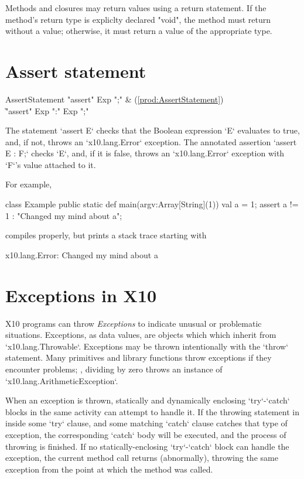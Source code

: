Methods and closures may return values using a return statement.
If the method's return type is expliclty declared \xcd"void",
the method must return without a value; otherwise, it must return
a value of the appropriate type.


\section{Assert statement} 

\begin{bbgrammar}
 AssertStatement    \: \xcd"assert" Exp \xcd";" & (\ref{prod:AssertStatement})\\%
    \| \xcd"assert" Exp  \xcd":" Exp  \xcd";"\\

\end{bbgrammar}

The statement \xcd`assert E` checks that the Boolean expression \xcd`E`
evaluates to true, and, if not, throws an \xcd`x10.lang.Error`  exception.  
The annotated assertion \xcd`assert E : F;` checks \xcd`E`, and, if it is
false, throws an \xcd`x10.lang.Error` exception with \xcd`F`'s value attached
to it. 

For example, 
% 
\begin{xten}
class Example {
  public static def main(argv:Array[String](1)) {
    val a = 1;
    assert a != 1 : "Changed my mind about a";
  }
}
\end{xten}
\noindent
compiles properly, but prints a stack trace starting with 
\begin{xten}
x10.lang.Error: Changed my mind about a
\end{xten}


\section{Exceptions in X10}

X10 programs can throw {\em Exceptions} to indicate unusual or problematic
situations.  Exceptions, as data values, are objects which which inherit from
\xcd`x10.lang.Throwable`.    Exceptions may be thrown intentionally with the
\xcd`throw` statement. Many primitives and library functions throw exceptions
if they encounter problems; \eg, dividing by zero throws an instance of
\xcd`x10.lang.ArithmeticException`. 

When an exception is thrown, statically and dynamically enclosing
\xcd`try`-\xcd`catch` blocks in the same activity can attempt to handle it.   If the throwing
statement in inside some \xcd`try` clause, and some matching \xcd`catch`
clause catches that type of exception, the corresponding \xcd`catch` body will
be executed, and the process of throwing is finished.  
If no statically-enclosing \xcd`try`-\xcd`catch` block can handle the
exception, the current method call returns (abnormally), throwing the same
exception from the point at which the method was called.  

